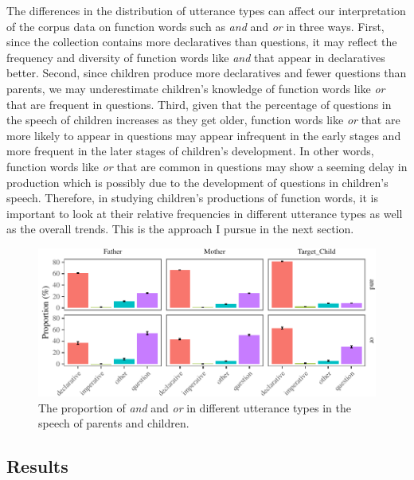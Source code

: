 \documentclass[floatsintext,man]{apa6}
\theoremstyle{definition}
\theoremstyle{definition}
\theoremstyle{definition}
\theoremstyle{remark}
\begin{document}
The differences in the distribution of utterance types can affect our
interpretation of the corpus data on function words such as \emph{and}
and \emph{or} in three ways. First, since the collection contains more
declaratives than questions, it may reflect the frequency and diversity
of function words like \emph{and} that appear in declaratives better.
Second, since children produce more declaratives and fewer questions
than parents, we may underestimate children's knowledge of function
words like \emph{or} that are frequent in questions. Third, given that
the percentage of questions in the speech of children increases as they
get older, function words like \emph{or} that are more likely to appear
in questions may appear infrequent in the early stages and more frequent
in the later stages of children's development. In other words, function
words like \emph{or} that are common in questions may show a seeming
delay in production which is possibly due to the development of
questions in children's speech. Therefore, in studying children's
productions of function words, it is important to look at their relative
frequencies in different utterance types as well as the overall trends.
This is the approach I pursue in the next section.

\begin{figure}[tb]

{\centering \includegraphics{figs/CnctPropbySpeechAct-1} 

}

\caption{The proportion of \textit{and} and \textit{or} in different utterance types in the speech of parents and children.}\label{fig:CnctPropbySpeechAct}
\end{figure}

\subsection{Results}\label{study1results}
\end{document}
